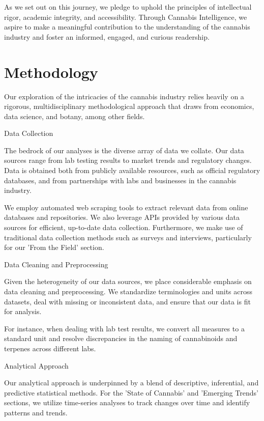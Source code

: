 \documentclass[../article.tex, 12pt]{subfiles}
\begin{document}
\begin{multicols*}{2}
As we set out on this journey, we pledge to uphold the principles of intellectual rigor, academic integrity, and accessibility. Through Cannabis Intelligence, we aspire to make a meaningful contribution to the understanding of the cannabis industry and foster an informed, engaged, and curious readership.

\section{Methodology}
\label{sec:methodology}

Our exploration of the intricacies of the cannabis industry relies heavily on a rigorous, multidisciplinary methodological approach that draws from economics, data science, and botany, among other fields.

Data Collection

The bedrock of our analyses is the diverse array of data we collate. Our data sources range from lab testing results to market trends and regulatory changes. Data is obtained both from publicly available resources, such as official regulatory databases, and from partnerships with labs and businesses in the cannabis industry.

We employ automated web scraping tools to extract relevant data from online databases and repositories. We also leverage APIs provided by various data sources for efficient, up-to-date data collection. Furthermore, we make use of traditional data collection methods such as surveys and interviews, particularly for our 'From the Field' section.

Data Cleaning and Preprocessing

Given the heterogeneity of our data sources, we place considerable emphasis on data cleaning and preprocessing. We standardize terminologies and units across datasets, deal with missing or inconsistent data, and ensure that our data is fit for analysis.

For instance, when dealing with lab test results, we convert all measures to a standard unit and resolve discrepancies in the naming of cannabinoids and terpenes across different labs.

Analytical Approach

Our analytical approach is underpinned by a blend of descriptive, inferential, and predictive statistical methods. For the 'State of Cannabis' and 'Emerging Trends' sections, we utilize time-series analyses to track changes over time and identify patterns and trends.


\end{multicols*}
\end{document}
